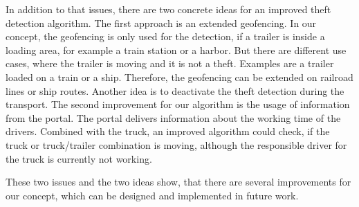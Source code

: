 In addition to that issues, there are two concrete ideas for an improved theft detection algorithm. The first approach is an extended geofencing. In our concept, the geofencing is only used for the detection, if a trailer is inside a loading area, for example a train station or a harbor. But there are different use cases, where the trailer is moving and it is not a theft. Examples are a trailer loaded on a train or a ship. Therefore, the geofencing can be extended on railroad lines or ship routes. Another idea is to deactivate the theft detection during the transport. The second improvement for our algorithm is the usage of information from the portal. The portal delivers information about the working time of the drivers. Combined with the truck, an improved algorithm could check, if the truck or truck/trailer combination is moving, although the responsible driver for the truck is currently not working. 

These two issues and the two ideas show, that there are several improvements for our concept, which can be designed and implemented in future work.

\clearpage